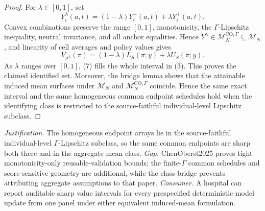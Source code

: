 \documentclass{article}
\begin{document}
\begin{proof}
For \(\lambda\in[0,1]\), set
\[
Y_i^\lambda(a,t)=(1-\lambda)Y_i^-(a,t)+\lambda Y_i^+(a,t).
\]
Convex combinations preserve the range \([0,1]\), monotonicity, the \(\Gamma\)-Lipschitz inequality, neutral invariance, and all anchor equalities.  Hence \(Y^\lambda\in\mathcal M_N^{\mathrm{CO},\Gamma}\subseteq\mathcal M_N\), and linearity of cell averages and policy values gives
\[
V_{\mu^\lambda}(\pi)
=(1-\lambda)L_S(\pi;y)+\lambda U_S(\pi;y).
\tag{7}
\]
As \(\lambda\) ranges over \([0,1]\), (7) fills the whole interval in (3).  This proves the claimed identified set.  Moreover, the bridge lemma shows that the attainable induced mean surfaces under \(\mathcal M_N\) and \(\mathcal M_N^{\mathrm{CO},\Gamma}\) coincide.  Hence the same exact interval and the same homogeneous common endpoint schedules hold when the identifying class is restricted to the source-faithful individual-level Lipschitz subclass.
\end{proof}
\par\smallskip\noindent \textit{Justification.} The homogeneous endpoint arrays lie in the source-faithful individual-level \(\Gamma\)-Lipschitz subclass, so the same common endpoints are sharp both there and in the aggregate mean class. \textit{Gap.} ChenOberst2025 proves tight monotonicity-only reusable-validation bounds; the finite-\(\Gamma\) common schedules and score-sensitive geometry are additional, while the class bridge prevents attributing aggregate assumptions to that paper. \textit{Consumer.} A hospital can report auditable sharp value intervals for every prespecified deterministic model update from one panel under either equivalent induced-mean formulation.
\end{document}
